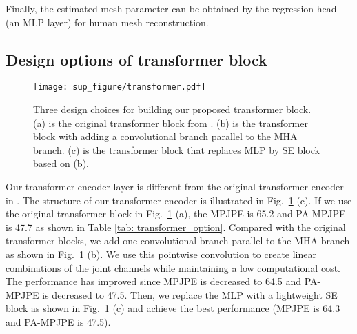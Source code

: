 \documentclass[sigconf]{acmart}
\begin{document}
Finally, the estimated mesh parameter  can be obtained by the regression head (an MLP layer) for human mesh reconstruction.  


\subsection{Design options of transformer block}

\begin{figure}[htp]
\vspace{-5pt}
  \centering
  \texttt{[image: sup\_figure/transformer.pdf]}
  \vspace{-5pt}
  \caption{Three design choices for building our proposed transformer block. (a) is the original transformer block from \cite{Dosovitskiy2020ViT}. (b) is the transformer block with adding a convolutional branch parallel to the MHA branch. (c) is the transformer block that replaces MLP by SE block based on (b).}
  \label{fig:transformer}
\end{figure}

\begin{table}[htp]
\tiny
\centering
  \caption{Ablation study on different design options of transformer block. Results are evaluated on Human3.6M dataset.}
\label{tab: transformer_option}
\vspace{-5pt}
\end{table}

Our transformer encoder layer is different from the original transformer encoder in \cite{Dosovitskiy2020ViT}. The structure of our transformer encoder is illustrated in Fig.~\ref{fig:transformer} (c). If we use the original transformer block in Fig.~\ref{fig:transformer} (a), the MPJPE is 65.2 and PA-MPJPE is 47.7 as shown in Table \ref{tab: transformer_option}. Compared with the original transformer blocks, we add one convolutional branch parallel to the MHA branch as shown in Fig.~\ref{fig:transformer} (b). We use this pointwise convolution to create linear combinations of the joint channels while maintaining a low computational cost. The performance has improved since MPJPE is decreased to 64.5 and PA-MPJPE is decreased to 47.5. Then, we replace the MLP with a lightweight SE block \cite{hu2018senet} as shown in Fig.~\ref{fig:transformer} (c) and achieve the best performance (MPJPE is 64.3 and PA-MPJPE is 47.5).
\end{document}

